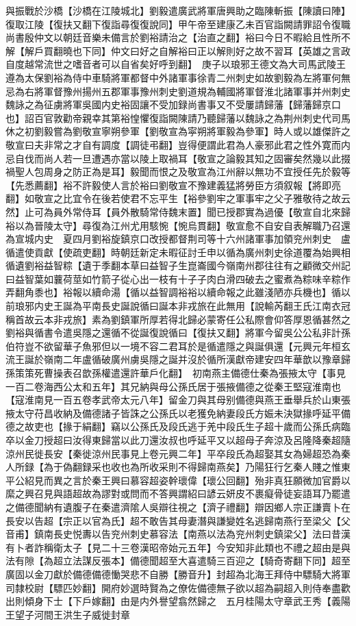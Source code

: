 與振戰於沙橋【沙橋在江陵城北】劉毅遣廣武將軍唐興助之臨陳斬振【陳讀曰陣】復取江陵【復扶又翻下復詣尋復復說同】甲午帝至建康乙未百官詣闕請罪詔令復職尚書殷仲文以朝廷音樂未備言於劉裕請治之【治直之翻】裕曰今日不暇給且性所不解【解戶買翻曉也下同】仲文曰好之自解裕曰正以解則好之故不習耳【英雄之言政自度越常流世之嗜音者可以自省矣好呼到翻】　庚子以琅邪王德文為大司馬武陵王遵為太保劉裕為侍中車騎將軍都督中外諸軍事徐青二州刺史如故劉毅為左將軍何無忌為右將軍督豫州揚州五郡軍事豫州刺史劉道規為輔國將軍督淮北諸軍事并州刺史魏詠之為征虜將軍吳國内史裕固讓不受加録尚書事又不受屢請歸藩【歸藩歸京口也】詔百官敦勸帝親幸其第裕惶懼復詣闕陳請乃聽歸藩以魏詠之為荆州刺史代司馬休之初劉毅嘗為劉敬宣寧朔參軍【劉敬宣為寜朔將軍毅為參軍】時人或以雄傑許之敬宣曰夫非常之才自有調度【調徒弔翻】豈得便謂此君為人豪邪此君之性外寛而内忌自伐而尚人若一旦遭遇亦當以陵上取禍耳【敬宣之論毅其知之固審矣然幾以此掇禍聖人包周身之防正為是耳】毅聞而恨之及敬宣為江州辭以無功不宜授任先於毅等【先悉薦翻】裕不許毅使人言於裕曰劉敬宣不豫建義猛將勞臣方須叙報【將即亮翻】如敬宣之比宜令在後若使君不忘平生【裕參劉牢之軍事牢之父子雅敬待之故云然】止可為員外常侍耳【員外散騎常侍魏末置】聞已授郡實為過優【敬宣自北來歸裕以為晉陵太守】尋復為江州尤用駭惋【惋烏貫翻】敬宣愈不自安自表解職乃召還為宣城内史　夏四月劉裕旋鎮京口改授都督荆司等十六州諸軍事加領兖州刺史　盧循遣使貢獻【使疏吏翻】時朝廷新定未暇征討壬申以循為廣州刺史徐道覆為始興相循遺劉裕益智粽【遺于季翻本草曰益智子生崑崙國今嶺南州郡往往有之顧微交州記曰益智葉如蘘荷莖如竹箭子從心出一枝有十子子肉白滑四破去之蜜煮為粽味辛粽作弄翻角黍也】裕報以續命湯【循以益智調裕裕以續命報之此雖淺陋亦兵機也】循以前琅邪内史王誕為平南長史誕說循曰誕本非戎旅在此無用【說輸芮翻王氏江南衣冠稱首故云本非戎旅】素為劉鎮軍所厚若得北歸必蒙寄任公私際會仰答厚恩循甚然之劉裕與循書令遣吳隱之還循不從誕復說循曰【復扶又翻】將軍今留吳公公私非計孫伯符豈不欲留華子魚邪但以一境不容二君耳於是循遣隱之與誕俱還【元興元年桓玄流王誕於嶺南二年盧循破廣州虜吳隱之誕并沒於循所漢獻帝建安四年華歆以豫章歸孫策策死曹操表召歆孫權遣還許華戶化翻】　初南燕主備德仕秦為張掖太守【事見一百二卷海西公太和五年】其兄納與母公孫氏居于張掖備德之從秦王堅寇淮南也【寇淮南見一百五卷孝武帝太元八年】留金刀與其母别備德與燕王垂舉兵於山東張掖太守苻昌收納及備德諸子皆誅之公孫氏以老獲免納妻段氏方娠未決獄掾呼延平備德之故吏也【掾于絹翻】竊以公孫氏及段氏逃于羌中段氏生子超十歲而公孫氏病臨卒以金刀授超曰汝得東歸當以此刀還汝叔也呼延平又以超母子奔涼及呂隆降秦超隨涼州民徙長安【秦徙涼州民事見上卷元興二年】平卒段氏為超娶其女為婦超恐為秦人所録【為于偽翻録采也收也為所收采則不得歸南燕矣】乃陽狂行乞秦人賤之惟東平公紹見而異之言於秦王興曰慕容超姿幹瓌偉【瓌公回翻】殆非真狂願微加官爵以縻之興召見與語超故為謬對或問而不答興謂紹曰諺云妍皮不裹癡骨徒妄語耳乃罷遣之備德聞納有遺腹子在秦遣濟隂人吳辯往視之【濟子禮翻】辯因鄉人宗正謙賣卜在長安以告超【宗正以官為氏】超不敢告其母妻潛與謙變姓名逃歸南燕行至梁父【父音甫】鎮南長史悦夀以告兖州刺史慕容法【南燕以法為兖州刺史鎮梁父】法曰昔漢有卜者詐稱衛太子【見二十三卷漢昭帝始元五年】今安知非此類也不禮之超由是與法有隙【為超立法謀反張本】備德聞超至大喜遣騎三百迎之【騎奇寄翻下同】超至廣固以金刀獻於備德備德慟哭悲不自勝【勝音升】封超為北海王拜侍中驃騎大將軍司隸校尉【驃匹妙翻】開府妙選時賢為之僚佐備德無子欲以超為嗣超入則侍奉盡歡出則傾身下士【下戶嫁翻】由是内外譽望翕然歸之　五月桂陽太守章武王秀【義陽王望子河間王洪生子威徙封章